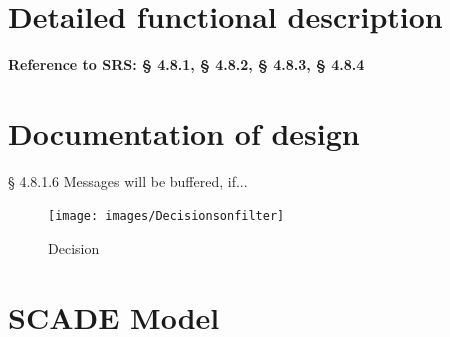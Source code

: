 \documentclass{template/openetcs_report}
\begin{document}
\section{Detailed functional description}
\textbf{Reference to \gls{SRS}: § 4.8.1, § 4.8.2, § 4.8.3, § 4.8.4}\\

\section{Documentation of design}
§ 4.8.1.6 Messages will be buffered, if...\\

\begin{figure}[hbtp]
\centering
\texttt{[image: images/Decisionsonfilter]}
\caption{Decision}
\end{figure}
 \newpage

\section{SCADE Model}





 
\appendix




\newpage
{}

\printindex

\end{document}
